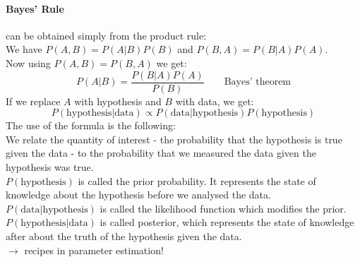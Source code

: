 \paragraph{Bayes' Rule} can be obtained simply from the product rule:\\
We have $P(A,B)=P(A|B)P(B)$ and $P(B,A)=P(B|A)P(A)$.\\
Now using $P(A,B)=P(B,A)$ we get:
\begin{equation*}
P(A|B)=\frac{P(B|A)P(A)}{P(B)} \qquad \text{Bayes' theorem}
\end{equation*}
If we replace $A$ with hypothesis and $B$ with data, we get:
\begin{equation*}
P(\text{hypothesis}|\text{data})\propto P(\text{data}|\text{hypothesis})P(\text{hypothesis})
\end{equation*}
The use of the formula is the following:\\
We relate the quantity of interest - the probability that the hypothesis is true given the data - to the probability that we measured the data given the hypothesis was true.\\
$P(\text{hypothesis})$ is called the prior probability. It represents the state of knowledge about the hypothesis before we analysed the data.\\
$P(\text{data}|\text{hypothesis})$ is called the likelihood function which modifies the prior.\\
$P(\text{hypothesis}|\text{data})$ is called posterior, which represents the state of knowledge after about the truth of the hypothesis given the data.\\
$\to$ recipes in parameter estimation!
